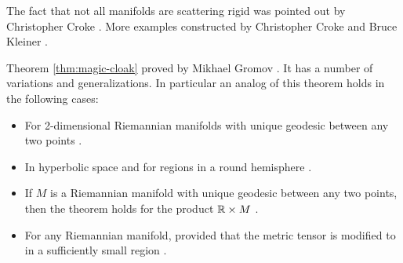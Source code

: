 The fact that not all manifolds are scattering rigid was pointed out by Christopher Croke \cite{croke-1991}.
More examples constructed by Christopher Croke and Bruce Kleiner \cite{croke-kleiner-1994}.

Theorem \ref{thm:magic-cloak} proved by Mikhael Gromov \cite{gromov-1983}.
It has a number of variations and generalizations.
In particular an analog of this theorem holds in the following cases:
\begin{itemize}
\item For 2-dimensional Riemannian manifolds with unique geodesic between any two points \cite{pestov-uhlmann}.
\item In hyperbolic space \cite{besson-courtois-gallot-1995, } and for  regions in a round  hemisphere \cite{michel-1981}.
\item If $M$ is a Riemannian manifold with unique geodesic between any two points, then the theorem holds for the product $\mathbb{R}\times M$ \cite{croke-kleiner-1998}.
\item For any Riemannian manifold, provided that the metric tensor is modified to in a sufficiently small region \cite{burago-ivanov-2010}.
\end{itemize}



